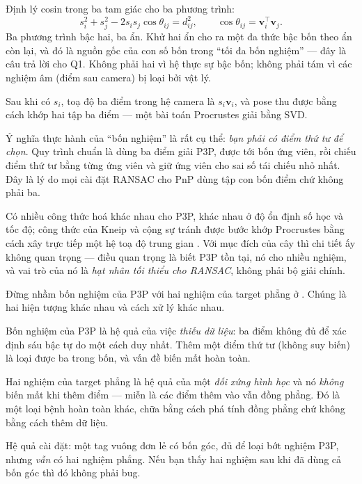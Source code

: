 \documentclass[../../marker.tex]{subfiles}
\begin{document}
Định lý cosin trong ba tam giác cho ba phương trình:
\[
s_i^2 + s_j^2 - 2s_i s_j \cos\theta_{ij} = d_{ij}^2, \qquad \cos\theta_{ij} = \mathbf{v}_i^\top\mathbf{v}_j .
\]
Ba phương trình bậc hai, ba ẩn. Khử hai ẩn cho ra một đa thức bậc bốn theo ẩn còn lại, và đó là nguồn gốc của con số bốn trong ``tối đa bốn nghiệm'' --- đây là câu trả lời cho Q1. Không phải hai vì hệ thực sự bậc bốn; không phải tám vì các nghiệm âm (điểm sau camera) bị loại bởi vật lý.

Sau khi có \(s_i\), toạ độ ba điểm trong hệ camera là \(s_i\mathbf{v}_i\), và pose thu được bằng cách khớp hai tập ba điểm --- một bài toán Procrustes giải bằng SVD.

Ý nghĩa thực hành của ``bốn nghiệm'' là rất cụ thể: \emph{bạn phải có điểm thứ tư để chọn}. Quy trình chuẩn là dùng ba điểm giải P3P, được tới bốn ứng viên, rồi chiếu điểm thứ tư bằng từng ứng viên và giữ ứng viên cho sai số tái chiếu nhỏ nhất. Đây là lý do mọi cài đặt RANSAC cho PnP dùng tập con bốn điểm chứ không phải ba.

Có nhiều công thức hoá khác nhau cho P3P, khác nhau ở độ ổn định số học và tốc độ; công thức của Kneip và cộng sự tránh được bước khớp Procrustes bằng cách xây trực tiếp một hệ toạ độ trung gian \cite{kneip2011novel}. Với mục đích của cây thì chi tiết ấy không quan trọng --- điều quan trọng là biết P3P tồn tại, nó cho nhiều nghiệm, và vai trò của nó là \emph{hạt nhân tối thiểu cho RANSAC}, không phải bộ giải chính.

\begin{cambay}
Đừng nhầm bốn nghiệm của P3P với hai nghiệm của target phẳng ở . Chúng là hai hiện tượng khác nhau và cách xử lý khác nhau.

Bốn nghiệm của P3P là hệ quả của việc \emph{thiếu dữ liệu}: ba điểm không đủ để xác định sáu bậc tự do một cách duy nhất. Thêm một điểm thứ tư (không suy biến) là loại được ba trong bốn, và vấn đề biến mất hoàn toàn.

Hai nghiệm của target phẳng là hệ quả của một \emph{đối xứng hình học} và nó \emph{không} biến mất khi thêm điểm --- miễn là các điểm thêm vào vẫn đồng phẳng. Đó là một loại bệnh hoàn toàn khác, chữa bằng cách phá tính đồng phẳng chứ không bằng cách thêm dữ liệu.

Hệ quả cài đặt: một tag vuông đơn lẻ có bốn góc, đủ để loại bớt nghiệm P3P, nhưng \emph{vẫn} có hai nghiệm phẳng. Nếu bạn thấy hai nghiệm sau khi đã dùng cả bốn góc thì đó không phải bug.
\end{cambay}
\end{document}
